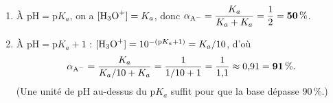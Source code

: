 \documentclass[11pt,a4paper]{article}
\begin{document}
\begin{corrige}
\begin{enumerate}[label=\alph*)]
  \item À $\mathrm{pH} = \mathrm{p}K_a$, on a $[\ce{H3O+}] = K_a$, donc
        $\alpha_{\ce{A-}} = \dfrac{K_a}{K_a + K_a} = \dfrac12 = \mathbf{50\,\%}$.
  \item À $\mathrm{pH} = \mathrm{p}K_a + 1$ : $[\ce{H3O+}] = 10^{-(\mathrm{p}K_a+1)} = K_a/10$, d'où
        \[ \alpha_{\ce{A-}} = \frac{K_a}{K_a/10 + K_a} = \frac{1}{1/10 + 1} = \frac{1}{1{,}1} \approx 0{,}91
           = \mathbf{91\,\%}. \]
        (Une unité de pH au-dessus du $\mathrm{p}K_a$ suffit pour que la base dépasse $90\,\%$.)
\end{enumerate}
\end{corrige}
\end{document}
